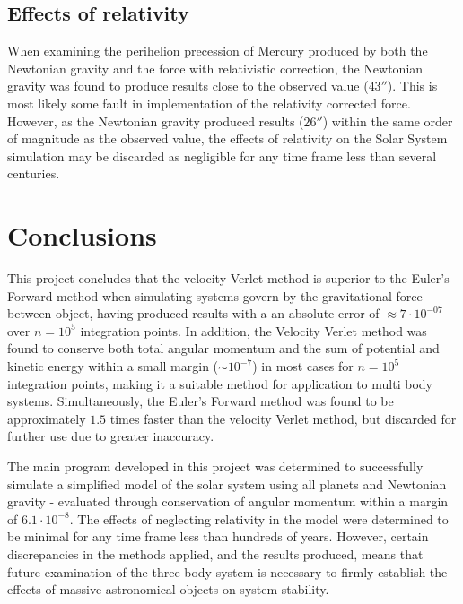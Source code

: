 \documentclass[%
oneside,                 %
final,                   %
10pt]{article}
\begin{document}
\subsection{Effects of relativity}
\label{subsec:effofrel}
When examining the perihelion precession of Mercury produced by both the Newtonian gravity and the force with relativistic correction, the Newtonian gravity was found to produce results close to the observed value ($43''$). This is most likely some fault in implementation of the relativity corrected force. However, as the Newtonian gravity produced results ($26''$) within the same order of magnitude as the observed value, the effects of relativity on the Solar System simulation may be discarded as negligible for any time frame less than several centuries.

\section{Conclusions}
This project concludes that the velocity Verlet method is superior to the Euler's Forward method when simulating systems govern by the gravitational force between object, having produced results with a an absolute error of $\approx 7 \cdot 10^{-07}$ over $n=10^5$ integration points. In addition, the Velocity Verlet method was found to conserve both total angular momentum and the sum of potential and kinetic energy within a small margin ($\sim 10^{-7}$) in most cases for $n=10^5$ integration points, making it a suitable method for application to multi body systems. Simultaneously, the Euler's Forward method was found to be approximately $1.5$ times faster than the velocity Verlet method, but discarded for further use due to greater inaccuracy. \newline

The main program developed in this project was determined to successfully simulate a simplified model of  the solar system using all planets and Newtonian gravity - evaluated through conservation of angular momentum within a margin of $6.1 \cdot 10^{-8}$.  The effects of neglecting relativity in the model were determined to be minimal for any time frame less than hundreds of years. However, certain discrepancies in the methods applied, and the results produced, means that future examination of the three body system is necessary to firmly establish the effects of massive astronomical objects on system stability. 



\end{document}
